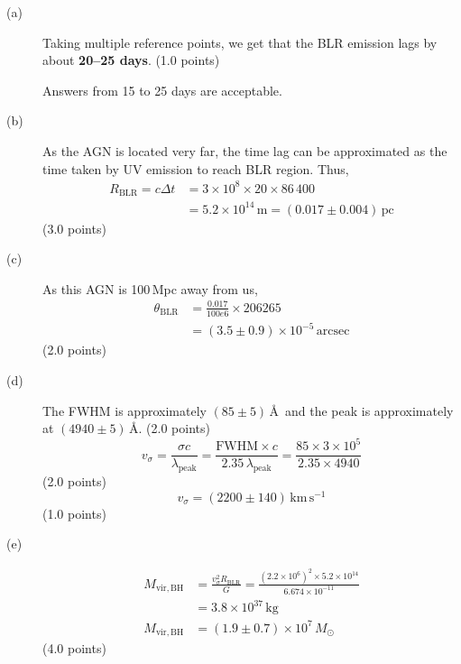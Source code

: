 \begin{description}
\item[(a)] Taking multiple reference points, we get that the BLR emission
  lags by about \textbf{20--25 days}. \hfill(1.0 points)

  Answers from 15 to 25 days are acceptable.

\item[(b)] As the AGN is located very far, the time lag can be approximated
  as the time taken by UV emission to reach BLR region. Thus,
  \begin{align*}
    R_{\mathrm{BLR}} = c\Delta t
      &= 3\times 10^{8}\times 20\times 86\,400 \\
      &= 5.2\times 10^{14}\,\mathrm{m} = (0.017\pm 0.004)\,\mathrm{pc}
  \end{align*}
  \hfill(3.0 points)

\item[(c)] As this AGN is 100\,Mpc away from us,
  \begin{align*}
    \theta_{\mathrm{BLR}} &= \frac{0.017}{100e6}\times 206265 \\
      &= (3.5\pm 0.9)\times 10^{-5}\,\mathrm{arcsec}
  \end{align*}
  \hfill(2.0 points)

\item[(d)] The FWHM is approximately $(85\pm 5)$\,\AA\ and the peak is
  approximately at $(4940\pm 5)$\,\AA. \hfill(2.0 points)
  \[ v_\sigma = \frac{\sigma c}{\lambda_{\mathrm{peak}}}
     = \frac{\mathrm{FWHM}\times c}{2.35\,\lambda_{\mathrm{peak}}}
     = \frac{85\times 3\times 10^{5}}{2.35\times 4940} \]
  \hfill(2.0 points)
  \[ v_\sigma = (2200\pm 140)\,\mathrm{km\,s^{-1}} \]
  \hfill(1.0 points)

\item[(e)] \mbox{}
  \begin{align*}
    M_{\mathrm{vir,BH}} &= \frac{v_\sigma^2 R_{\mathrm{BLR}}}{G}
      = \frac{(2.2\times 10^{6})^2\times 5.2\times 10^{14}}
             {6.674\times 10^{-11}} \\
      &= 3.8\times 10^{37}\,\mathrm{kg} \\
    M_{\mathrm{vir,BH}} &= (1.9\pm 0.7)\times 10^{7}\,M_\odot
  \end{align*}
  \hfill(4.0 points)
\end{description}
